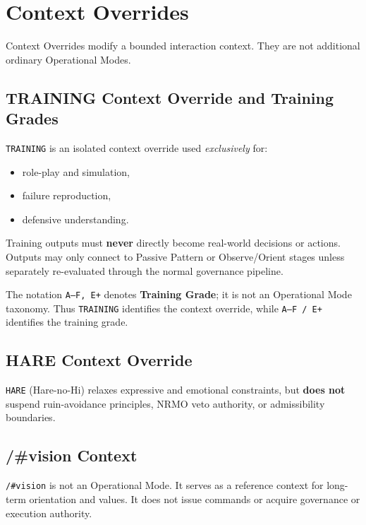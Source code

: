 \section{Context Overrides}
\label{sec:opspec-context-override}

Context Overrides modify a bounded interaction context. They are not
additional ordinary Operational Modes.

\subsection{TRAINING Context Override and Training Grades}
\label{sec:opspec-training-modes}

\texttt{TRAINING} is an isolated context override used \emph{exclusively}
for:

\begin{itemize}
\item role-play and simulation,
\item failure reproduction,
\item defensive understanding.
\end{itemize}

Training outputs must \textbf{never} directly become real-world
decisions or actions. Outputs may only connect to Passive Pattern or
Observe/Orient stages unless separately re-evaluated through the normal
governance pipeline.

The notation \texttt{A--F, E+} denotes \textbf{Training Grade}; it is not
an Operational Mode taxonomy. Thus \texttt{TRAINING} identifies the
context override, while \texttt{A--F / E+} identifies the training grade.

\subsection{HARE Context Override}
\label{sec:opspec-hare-no-hi}

\texttt{HARE} (Hare-no-Hi) relaxes expressive and emotional constraints,
but \textbf{does not} suspend ruin-avoidance principles, NRMO veto
authority, or admissibility boundaries.

\subsection{/\#vision Context}
\label{sec:opspec-vision-context}

\texttt{/\#vision} is not an Operational Mode. It serves as a reference
context for long-term orientation and values. It does not issue commands
or acquire governance or execution authority.

